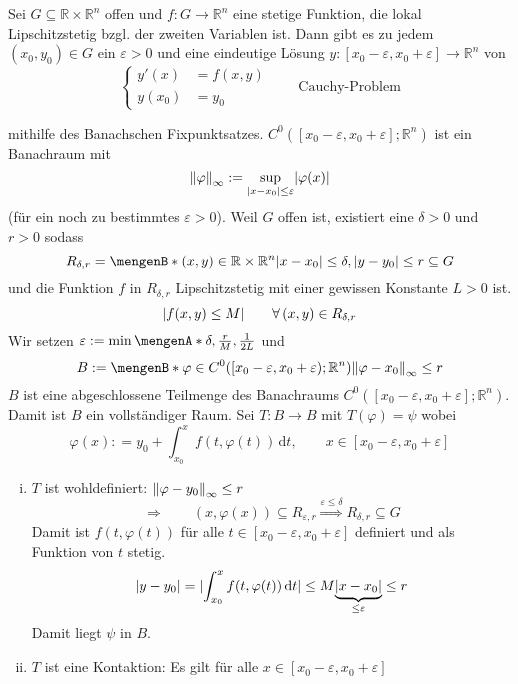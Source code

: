 \begin{satz}
	Sei $G \subseteq \mathbb{R} \times \mathbb{R}^n$ offen und $f: G \to \mathbb{R}^n$ eine stetige Funktion, die lokal Lipschitzstetig bzgl. der zweiten Variablen ist. Dann gibt es zu jedem $(x_0,y_0) \in G$ ein $\varepsilon >0$ und eine eindeutige Lösung $y : [x_0- \varepsilon, x_0 + \varepsilon] \to \mathbb{R}^n$ von
	\[
		\begin{cases}
			y'(x)&=f(x,y)\\
			y(x_0)&= y_0
		\end{cases} \qquad \text{Cauchy-Problem}
	\]
\end{satz}
\begin{beweis}
	mithilfe des Banachschen Fixpunktsatzes. $C^0([x_0- \varepsilon, x_0 + \varepsilon];\mathbb{R}^n)$ ist ein Banachraum mit 
	\[
		\norm{\varphi}_{\infty} := \sup_{\abs{x-x_0} \leq \varepsilon} \abs{\varphi(x)} 
	\]
	(für ein noch zu bestimmtes $\varepsilon >0 $). Weil $G$ offen ist, existiert eine $\delta >0$ und $r >0$ sodass
	\[
		R_{\delta ,r} = \set[(x,y) \in \mathbb{R} \times \mathbb{R}^n]{\abs{x-x_0} \leq \delta , \abs{y-y_0} \leq r} \subseteq G
	\]
	und die Funktion $f$ in $R_{\delta ,r}$ Lipschitzstetig mit einer gewissen Konstante $L >0$ ist.
	\[
		\lvert f(x,y) \leq M\rvert \qquad  \forall\, (x,y) \in R_{\delta ,r}
	\]
	Wir setzen $\varepsilon := \min \set{\delta , \frac{r}{M}, \frac{1}{2L}}$ und 
	\[
		B:= \set[\varphi \in C^0([x_0- \varepsilon, x_0 + \varepsilon);\mathbb{R}^n)]{\norm{\varphi-x_0}_{\infty} \leq r}
	\]
	$B$ ist eine abgeschlossene Teilmenge des Banachraums $C^0([x_0- \varepsilon, x_0 + \varepsilon]; \mathbb{R}^n)$. Damit ist $B$ ein vollständiger Raum.
	Sei $ T:B \to B$ mit $T(\varphi) = \psi$ wobei
	\[
		\varphi(x) : = y_0 + \int_{x_0}^{x} f(t,\varphi(t)) \,\mathrm{d}t, \qquad x \in [x_0- \varepsilon, x_0 + \varepsilon]
	\]
	\begin{enumerate}[(i)]
		\item $T$ ist wohldefiniert: $\norm{\varphi-y_0}_{\infty} \leq r$
		\[
			\Rightarrow \qquad (x,\varphi(x)) \subseteq R_{\varepsilon,r} \stackrel{\varepsilon \leq \delta }{\Rightarrow } R_{\delta ,r} \subseteq G
		\]
		Damit ist $f(t,\varphi(t))$ für alle $t \in [x_0- \varepsilon, x_0 + \varepsilon]$ definiert und als Funktion von $t$ stetig.
		\[
			\lvert y-y_0\rvert = \lvert\int_{x_0}^{x} f(t,\varphi(t)) \,\mathrm{d}t\rvert \leq M \underset{\leq \varepsilon}{\underbrace{\lvert x-x_0\rvert}} \leq r
		\]
		Damit liegt $\psi$ in $B$.
		\item $T$ ist eine Kontaktion: Es gilt für alle $x \in [x_0 - \varepsilon , x_0 + \varepsilon]$

\end{enumerate}
\end{beweis}
